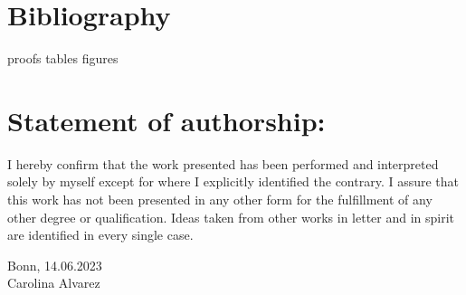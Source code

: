 \documentclass[12pt, a4paper]{article} %
\theoremstyle{MAstyle} \newtheorem{assumption}{Assumption}[section]
\theoremstyle{MAstyle} \newtheorem{definition}{Definition}[section]
\theoremstyle{MAstyle} \newtheorem{theorem}{Theorem}[section]
\theoremstyle{MAstyle} \newtheorem{lemma}{Lemma}[]
\begin{document}
	

	\newpage
	\section{Bibliography}
	\printbibliography[heading=none]
	
	\newpage


	\newpage
	\cleardoublepage
	\setcounter{page}{1}
	{proofs}
        {tables}
        {figures}
		
	\newpage
	\thispagestyle{empty}
	\section*{Statement of authorship:}	
	
		\vspace{3cm}
		
		I hereby confirm that the work presented has been performed and interpreted solely by myself except for where I explicitly identified the contrary. I assure that this work has not been presented in any other form for the fulfillment of any other degree or qualification. Ideas taken from other works in letter and in spirit are identified in every single case.
		
		\vspace{2cm}
		Bonn, 14.06.2023 \hrulefill \\
		\hspace*{0mm}Carolina Alvarez
		
		\vspace{\fill}
\end{document}
